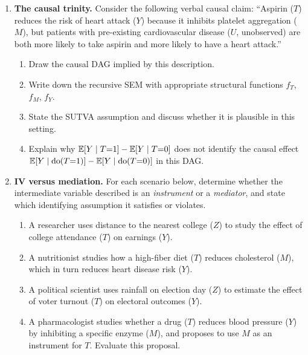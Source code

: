 \documentclass[master.tex]{subfiles}
\begin{document}
\begin{enumerate}[label=\textbf{\arabic*.}, leftmargin=*, itemsep=10pt]
  \item \textbf{The causal trinity.}
  Consider the following verbal causal claim: ``Aspirin ($T$) reduces the
  risk of heart attack ($Y$) because it inhibits platelet aggregation ($M$),
  but patients with pre-existing cardiovascular disease ($U$, unobserved)
  are both more likely to take aspirin and more likely to have a heart
  attack.''
  \begin{enumerate}[label=(\alph*)]
    \item Draw the causal DAG implied by this description.
    \item Write down the recursive SEM with appropriate structural functions
          $f_T$, $f_M$, $f_Y$.
    \item State the SUTVA assumption and discuss whether it is plausible in
          this setting.
    \item Explain why $\mathbb{E}[Y \mid T{=}1] - \mathbb{E}[Y \mid T{=}0]$ does not identify
          the causal effect $\mathbb{E}[Y \mid \mathrm{do}(T{=}1)] - \mathbb{E}[Y \mid \mathrm{do}(T{=}0)]$
          in this DAG.
  \end{enumerate}

  \item \textbf{IV versus mediation.}
  For each scenario below, determine whether the intermediate variable
  described is an \emph{instrument} or a \emph{mediator}, and state which
  identifying assumption it satisfies or violates.
  \begin{enumerate}[label=(\alph*)]
    \item A researcher uses distance to the nearest college ($Z$) to study
          the effect of college attendance ($T$) on earnings ($Y$).
    \item A nutritionist studies how a high-fiber diet ($T$) reduces
          cholesterol ($M$), which in turn reduces heart disease risk ($Y$).
    \item A political scientist uses rainfall on election day ($Z$) to
          estimate the effect of voter turnout ($T$) on electoral outcomes
          ($Y$).
    \item A pharmacologist studies whether a drug ($T$) reduces blood
          pressure ($Y$) by inhibiting a specific enzyme ($M$), and
          proposes to use $M$ as an instrument for $T$.  Evaluate this
          proposal.
  \end{enumerate}

\end{enumerate}

\newpage
\ifSubfilesClassLoaded{
  
  
}{}
\end{document}
